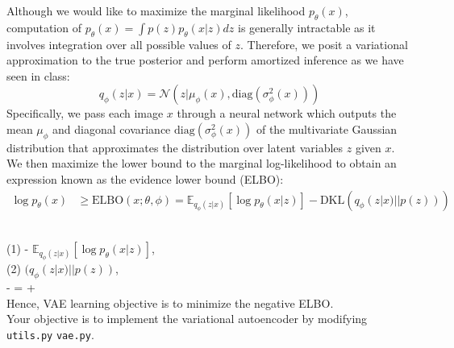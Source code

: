 \documentclass{article}
\theoremstyle{case}
\theoremstyle{definition}
\begin{document}
Although we would like to maximize the marginal likelihood $p_\theta(x)$, computation of $p_\theta(x) =  \int p(z)p_\theta (x|z)dz$ is generally intractable as it involves integration over all possible values of $z$. Therefore, we posit a variational approximation to the true posterior and perform amortized inference as we have seen in class:
\begin{equation*}
q_\phi(z|x) = \mathcal{N}(z|\mu_\phi(x), \text{diag}(\sigma^2_\phi(x)))
\end{equation*}
Specifically, we pass each image $x$ through a neural network which outputs the mean $\mu_\phi$ and diagonal covariance $\text{diag}(\sigma^2_\phi(x))$ of the multivariate Gaussian distribution that approximates the distribution over latent variables $z$ given $x$. We then maximize the lower bound to the marginal log-likelihood to obtain an expression known as the evidence lower bound (ELBO):
\begin{align*}
\log p_\theta(x) &\geq \text{ELBO}(x; \theta, \phi)= \mathbb{E}_{q_{\phi}(z|x)}[\log p_{\theta}(x|z)] - \text{DKL}(q_{\phi}(z|x)||p(z)))
\end{align*}

 \\
(1)  - $\mathbb{E}_{q_{\phi}(z|x)}[\log p_{\theta}(x|z)]$, \\
(2)  $(q_{\phi}(z|x)||p(z))$, \\
 - =  +  \\
Hence, VAE learning objective is to minimize the negative ELBO.\\

Your objective is to implement the variational autoencoder by modifying \texttt{utils.py}  \texttt{vae.py}.
\end{document}

